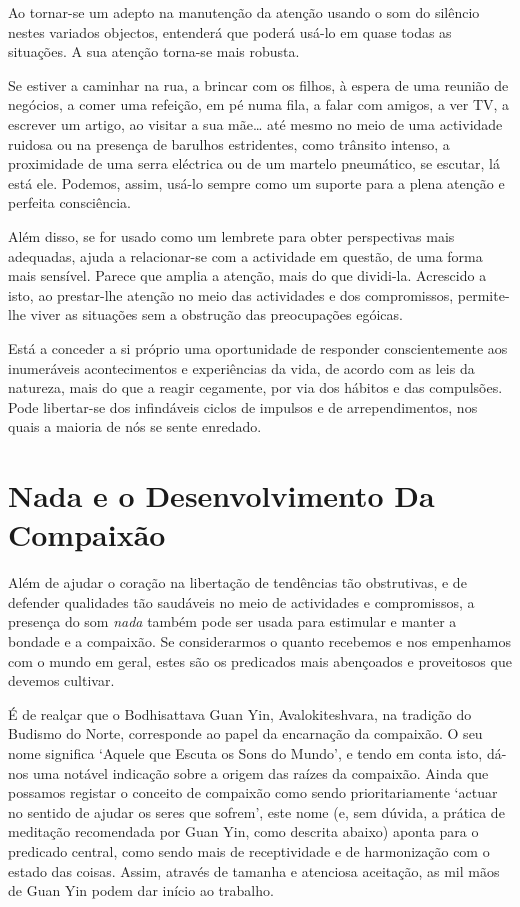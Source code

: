 Ao tornar-se um adepto na manutenção da atenção usando o som do silêncio
nestes variados objectos, entenderá que poderá usá-lo em quase todas as
situações. A sua atenção torna-se mais robusta.

Se estiver a caminhar na rua, a brincar com os filhos, à espera de uma
reunião de negócios, a comer uma refeição, em pé numa fila, a falar com
amigos, a ver TV, a escrever um artigo, ao visitar a sua mãe\ldots{} até
mesmo no meio de uma actividade ruidosa ou na presença de barulhos
estridentes, como trânsito intenso, a proximidade de uma serra eléctrica
ou de um martelo pneumático, se escutar, lá está ele. Podemos, assim,
usá-lo sempre como um suporte para a plena atenção e perfeita
consciência.

Além disso, se for usado como um lembrete para obter perspectivas mais
adequadas, ajuda a relacionar-se com a actividade em questão, de uma
forma mais sensível. Parece que amplia a atenção, mais do que dividi-la.
Acrescido a isto, ao prestar-lhe atenção no meio das actividades e dos
compromissos, permite-lhe viver as situações sem a obstrução das
preocupações egóicas.

Está a conceder a si próprio uma oportunidade de responder
conscientemente aos inumeráveis acontecimentos e experiências da vida,
de acordo com as leis da natureza, mais do que a reagir cegamente, por
via dos hábitos e das compulsões. Pode libertar-se dos infindáveis
ciclos de impulsos e de arrependimentos, nos quais a maioria de nós se
sente enredado.

\section{Nada e o Desenvolvimento Da Compaixão}

Além de ajudar o coração na libertação de tendências tão obstrutivas, e
de defender qualidades tão saudáveis no meio de actividades e
compromissos, a presença do som \emph{nada} também pode ser usada para
estimular e manter a bondade e a compaixão. Se considerarmos o quanto
recebemos e nos empenhamos com o mundo em geral, estes são os predicados
mais abençoados e proveitosos que devemos cultivar.

É de realçar que o Bodhisattava Guan Yin, Avalokiteshvara, na tradição
do Budismo do Norte, corresponde ao papel da encarnação da compaixão. O
seu nome significa `Aquele que Escuta os Sons do Mundo', e tendo em
conta isto, dá-nos uma notável indicação sobre a origem das raízes da
compaixão. Ainda que possamos registar o conceito de compaixão como
sendo prioritariamente `actuar no sentido de ajudar os seres que
sofrem', este nome (e, sem dúvida, a prática de meditação recomendada
por Guan Yin, como descrita abaixo) aponta para o predicado central,
como sendo mais de receptividade e de harmonização com o estado das
coisas. Assim, através de tamanha e atenciosa aceitação, as mil mãos de
Guan Yin podem dar início ao trabalho.

